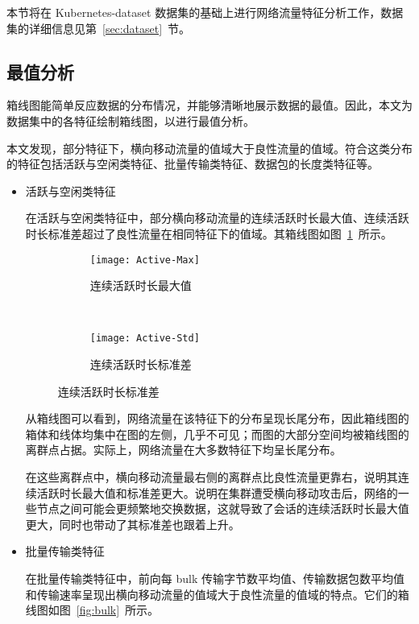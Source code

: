 {本节将在 Kubernetes-dataset 数据集的基础上进行网络流量特征分析工作，数据集的详细信息见第~\ref{sec:dataset}~节。

\subsection{最值分析}
\label{sec:extreme}

箱线图能简单反应数据的分布情况，并能够清晰地展示数据的最值。因此，本文为数据集中的各特征绘制箱线图，以进行最值分析。

本文发现，部分特征下，横向移动流量的值域大于良性流量的值域。符合这类分布的特征包括活跃与空闲类特征、批量传输类特征、数据包的长度类特征等。

\begin{itemize}
\item {活跃与空闲类特征

在活跃与空闲类特征中，部分横向移动流量的连续活跃时长最大值、连续活跃时长标准差超过了良性流量在相同特征下的值域。其箱线图如图~\ref{fig:active-max}~所示。

\begin{figure}[t]
    \centering
    \begin{subfigure}[b]{0.48\textwidth}
      \texttt{[image: Active-Max]}
      \caption{连续活跃时长最大值}
    \end{subfigure}
    ~
    \begin{subfigure}[b]{0.48\textwidth}
      \texttt{[image: Active-Std]}
      \caption{连续活跃时长标准差}
    \end{subfigure}
    \label{fig:active-max}
\end{figure}

从箱线图可以看到，网络流量在该特征下的分布呈现长尾分布，因此箱线图的箱体和线体均集中在图的左侧，几乎不可见；而图的大部分空间均被箱线图的离群点占据。实际上，网络流量在大多数特征下均呈长尾分布。

在这些离群点中，横向移动流量最右侧的离群点比良性流量更靠右，说明其连续活跃时长最大值和标准差更大。说明在集群遭受横向移动攻击后，网络的一些节点之间可能会更频繁地交换数据，这就导致了会话的连续活跃时长最大值更大，同时也带动了其标准差也跟着上升。

}

\item {批量传输类特征

在批量传输类特征中，前向每 bulk 传输字节数平均值、传输数据包数平均值和传输速率呈现出横向移动流量的值域大于良性流量的值域的特点。它们的箱线图如图~\ref{fig:bulk}~所示。

}
\end{itemize}}
